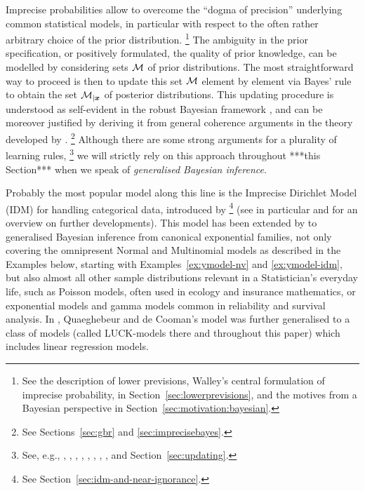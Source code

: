 
Imprecise probabilities allow to overcome the ``dogma of
precision'' \parencite[\S 5]{1991:walley}
underlying common statistical models, in particular with respect to the often rather arbitrary
choice of the prior distribution.%
\footnote{See the description of lower previsions,
Walley's central formulation of imprecise probability, in Section~\ref{sec:lowerprevisions},
and the motives from a Bayesian perspective in Section~\ref{sec:motivation:bayesian}.}
The ambiguity in the prior
specification, or positively formulated, the quality of prior
knowledge, can be modelled by considering sets ${\cal M}$ of prior distributions.
The most straightforward way to proceed is then to update this set ${\cal M}$
element by element via Bayes' rule %
to obtain the set ${\cal M}_{|{\bm x}}$ of posterior distributions. This
updating procedure is understood as self-evident in the robust
Bayesian framework \parencite[e.g.,][]{2000:rios}, and can be moreover
justified by deriving it from general coherence arguments in the
theory developed by \textcite{1991:walley}.%
\footnote{See Sections~\ref{sec:gbr} and \ref{sec:imprecisebayes}.}
Although there are some
strong arguments for a plurality of learning rules,%
\footnote{See, e.g.,
\textcite{2009:Coolen:Augustin}, \textcite{2007:weichselberger}, \textcite{2007a:cattaneo},
\textcite{2007:held}, \textcite{2007:held-isipta07}, \textcite{2009:Coolen:Augustin},
\textcite{2004:augustin:coolen}, \textcite{2003:augustin}, and Section~\ref{sec:updating}.} we
will strictly rely on this approach throughout ***this Section*** when we
speak of \emph{generalised Bayesian inference}.


Probably the most popular model along this line is the Imprecise
Dirichlet Model (IDM) for handling categorical data, introduced by
\textcite{1996:walley::idm}%
\footnote{See Section~\ref{sec:idm-and-near-ignorance}.}
(see in particular \textcite{2005:bernard} and \textcite{2009:bernard} %
for an overview on further developments). This model has been
extended by \textcite{2005:quaeghebeurcooman} to generalised Bayesian inference from
canonical exponential families, not only covering the
omnipresent Normal and Multinomial models as described in the
Examples below, starting with Examples~\ref{ex:ymodel-nv} and \ref{ex:ymodel-idm},
but also almost all other sample distributions relevant in a Statistician's everyday life, such as
Poisson models, often used in ecology and insurance mathematics, or
exponential models and gamma models common in reliability and
survival analysis. In \textcite{Walter2007a}, Quaeghebeur and de
Cooman's model was further generalised to a class of models (called
LUCK-models there and throughout this paper) which includes
linear regression models.

